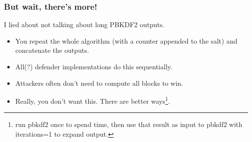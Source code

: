 \documentclass[aspectratio=169]{beamer}
\begin{document}
\frame
{
  \frametitle{But wait, there's more!}

  I lied about not talking about long PBKDF2 outputs.

  \begin{itemize}
  \item<1> You repeat the whole algorithm (with a counter appended to the salt) and concatenate the outputs.
  \item<2> All(?) defender implementations do this sequentially.
  \item<3> Attackers often don't need to compute all blocks to win.
  \item<4> Really, you don't want this.  There are better ways\footnote<4>{run pbkdf2 once to spend time, then use that result as input to pbkdf2 with iterations=1 to expand output.}.
  \end{itemize}

}
\end{document}
